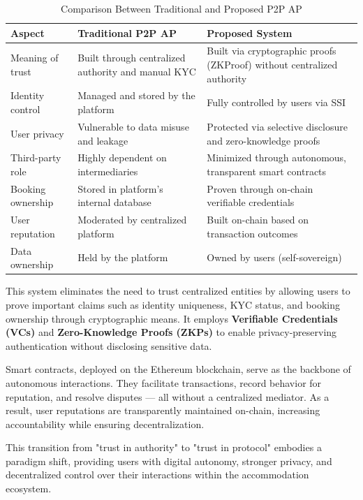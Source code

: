\documentclass[conference]{IEEEtran}
\begin{document}
\begin{table}[ht]
\caption{Comparison Between Traditional and Proposed P2P AP}
\label{tab:comparison}
\small
\begin{tabularx}{\columnwidth}{|p{2.5cm}|>{\raggedright\arraybackslash}X|>{\raggedright\arraybackslash}X|}
\hline
\textbf{Aspect} & \textbf{Traditional P2P AP} & \textbf{Proposed System} \\
\hline
Meaning of trust & Built through centralized authority and manual KYC & Built via cryptographic proofs (ZKProof) without centralized authority \\
\hline
Identity control & Managed and stored by the platform & Fully controlled by users via SSI \\
\hline
User privacy & Vulnerable to data misuse and leakage & Protected via selective disclosure and zero-knowledge proofs \\
\hline
Third-party role & Highly dependent on intermediaries & Minimized through autonomous, transparent smart contracts \\
\hline
Booking ownership & Stored in platform's internal database & Proven through on-chain verifiable credentials \\
\hline
User reputation & Moderated by centralized platform & Built on-chain based on transaction outcomes \\
\hline
Data ownership & Held by the platform & Owned by users (self-sovereign) \\
\hline
\end{tabularx}
\end{table}

This system eliminates the need to trust centralized entities by allowing users to prove important claims such as identity uniqueness, KYC status, and booking ownership through cryptographic means. It employs \textbf{Verifiable Credentials (VCs)} and \textbf{Zero-Knowledge Proofs (ZKPs)} to enable privacy-preserving authentication without disclosing sensitive data.

Smart contracts, deployed on the Ethereum blockchain, serve as the backbone of autonomous interactions. They facilitate transactions, record behavior for reputation, and resolve disputes — all without a centralized mediator. As a result, user reputations are transparently maintained on-chain, increasing accountability while ensuring decentralization.

This transition from "trust in authority" to "trust in protocol" embodies a paradigm shift, providing users with digital autonomy, stronger privacy, and decentralized control over their interactions within the accommodation ecosystem.
\end{document}

